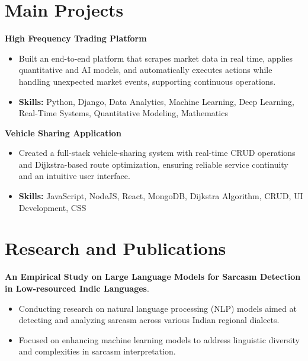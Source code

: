\documentclass[a4paper,11pt]{article}
\begin{document}
\section{\textbf{Main Projects}}

\vspace{1mm}
  \textbf{High Frequency Trading Platform  }
\vspace{-1.5mm} %
\begin{itemize}
  \item Built an end-to-end platform that scrapes market data in real time, applies quantitative and AI models, and automatically executes actions while handling unexpected market events, supporting continuous operations.
\vspace{-3mm}
  \item \textbf{Skills:} Python, Django, Data Analytics, Machine Learning, Deep Learning, Real-Time Systems, Quantitative Modeling, Mathematics
\end{itemize}


\vspace{1mm}
   \textbf{Vehicle Sharing Application }
\vspace{-1.5mm} %
\begin{itemize}
  \item Created a full-stack vehicle-sharing system with real-time CRUD operations and Dijkstra-based route optimization, ensuring reliable service continuity and an intuitive user interface.
\vspace{-3mm}
  \item \textbf{Skills:} JavaScript, NodeJS, React, MongoDB, Dijkstra Algorithm, CRUD, UI Development, CSS
\end{itemize}



\section{\textbf{Research and Publications} \hfill }
\vspace{1mm}
  \textbf{An Empirical Study on Large Language Models for Sarcasm Detection in Low-resourced Indic Languages}.
\vspace{-1mm} %
\begin{itemize}
  \item Conducting research on natural language processing (NLP) models aimed at detecting and analyzing sarcasm across various Indian regional dialects.
\vspace{-3mm}
  \item Focused on enhancing machine learning models to address linguistic diversity and complexities in sarcasm interpretation.
\end{itemize}
\end{document}
